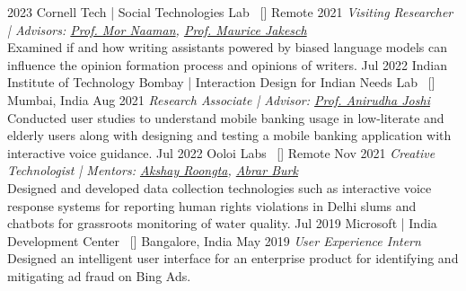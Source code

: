 \begin{experiences}
\researchexperience
    {2023}   {Cornell Tech | Social Technologies Lab{\normalfont  ~ [\href{https://s.tech.cornell.edu/}{\small{\websiteSymbol}}]
    }}{Remote}{}
    {2021} {\textit{Visiting Researcher | Advisors:  \href{https://tech.cornell.edu/people/mor-naaman/}{Prof. Mor Naaman}, \href{https://csslab.net/}{Prof. Maurice Jakesch}}\\
    Examined if and how writing assistants powered by biased language models can influence the opinion formation process and opinions of writers.
    }
    \emptySeparator
\researchexperience
    {Jul 2022}   {Indian Institute of Technology Bombay | Interaction Design for Indian Needs Lab{\normalfont  ~ [\href{http://idid.in/}{\small{\websiteSymbol}}]
    }}{Mumbai, India}{}
    {Aug 2021} {\textit{Research Associate | Advisor: \href{http://www.idc.iitb.ac.in/~anirudha/}{Prof. Anirudha Joshi}}\\
    Conducted user studies to understand mobile banking usage in low-literate and elderly users along with designing and testing a mobile banking application with interactive voice guidance.
    }
  \emptySeparator
\researchexperience
    {Jul 2022 }   {Ooloi Labs{\normalfont  ~ [\href{https://www.ooloilabs.in/}{\small{\websiteSymbol}}]
    }}{Remote}{}
    {Nov 2021} {\textit{Creative Technologist | Mentors: \href{http://akshayroongta.in/home/}{Akshay Roongta}, \href{https://www.linkedin.com/in/abrar-burk-083a1634/}{Abrar Burk}}\\
   Designed and developed data collection technologies such as interactive voice response systems for reporting human rights violations in Delhi slums and chatbots for grassroots monitoring of water quality.
    }
  \emptySeparator
\researchexperience
    {Jul 2019}   {Microsoft | India Development Center{\normalfont  ~ [\href{https://www.microsoft.com/en-in/msidc/}{\small{\websiteSymbol}}]
    }}{Bangalore, India}{}
    {May 2019} {\textit{User Experience Intern}\\
    Designed an intelligent user interface for an enterprise product for identifying and mitigating ad fraud on Bing Ads.
    }

\end{experiences}
